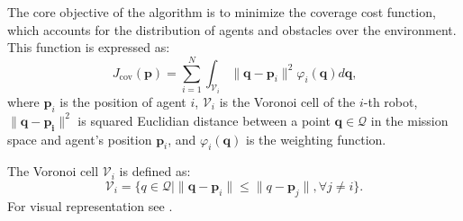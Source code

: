         The core objective of the algorithm is to minimize the coverage cost function, which accounts for the distribution of agents and obstacles over the environment. 
        This function is expressed as:
        \begin{equation}
            J_{\text{cov}}(\mathbf{p}) = \sum_{i=1}^{N} \int_{\mathcal{V}_i} \lVert\mathbf{q}-\mathbf{p}_i\rVert^2 \varphi_i (\mathbf{q})d\mathbf{q}\text{,}
            \label{coverage_cost_function}
        \end{equation}
        where $\mathbf{p}_i$ is the position of agent $i$, $\mathcal{V}_i$ is the Voronoi cell of the $i$-th robot, $\lVert\mathbf{q}-\mathbf{p_i}\rVert^2$ is squared Euclidian distance between a point $\mathbf{q} \in \mathcal{Q}$ in the mission space and agent's position $\mathbf{p}_i$, 
        and $\varphi_i (\mathbf{q})$ is the weighting function.

        The Voronoi cell $\mathcal{V}_i$ is defined as: 
        \begin{equation}
            \mathcal{V}_i = \{q \in \mathcal{Q} \lvert \lVert \mathbf{q} - \mathbf{p}_i \rVert \leq \lVert q - \mathbf{p}_j \rVert, \forall j \neq i\}\text{.}
        \end{equation}
        For visual representation see . 

